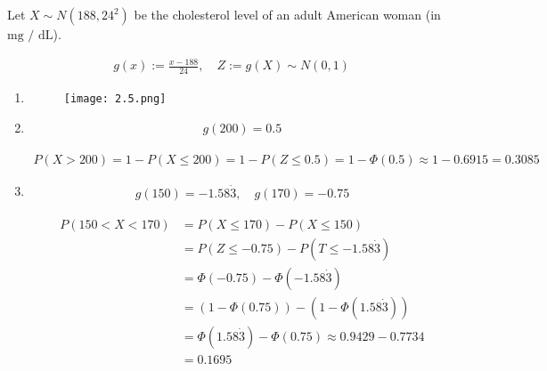 \begin{solution}

Let $X \sim N(188, 24^2)$ be the cholesterol level of an adult American woman (in $\text{mg / dL}$).

\begin{align*}
    g(x) := \frac{x - 188}{24},
    \quad
    Z := g(X) \sim N(0, 1)
\end{align*}

\begin{enumerate}[label = (\alph*)]

    \item 
    
    \lstset{style = fundament}
    
    
    \begin{figure}[H]
        \centering
        \texttt{[image: 2.5.png]}
    \end{figure}

    \item

    \begin{align*}
        g(200) = 0.5
    \end{align*}

    \begin{align*}
        P(X > 200)
        =
        1 - P(X \leq 200)
        =
        1 - P(Z \leq 0.5)
        =
        1 - \Phi(0.5)
        \approx
        1 - 0.6915
        =
        0.3085
    \end{align*}

    \item

    \begin{align*}
        g(150) = -1.58 \dot 3,
        \quad
        g(170) = -0.75
    \end{align*}

    \begin{align*}
        P(150 < X < 170)
        & =
        P(X \leq 170) - P(X \leq 150) \\
        & =
        P(Z \leq -0.75) - P(T \leq -1.58 \dot 3) \\
        & =
        \Phi(-0.75) - \Phi(-1.58 \dot 3) \\
        & =
        (1 - \Phi(0.75)) - (1 - \Phi(1.58 \dot 3)) \\
        & =
        \Phi(1.58 \dot 3) - \Phi(0.75)
        \approx
        0.9429 - 0.7734 \\
        & =
        0.1695
    \end{align*}


\end{enumerate}
\end{solution}
